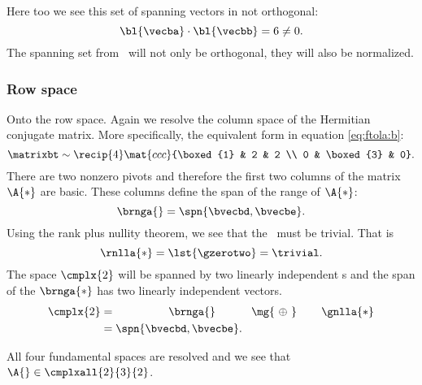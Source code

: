 Here too we see this set of spanning vectors in not orthogonal:
\begin{equation}
  {\bl{ \vecba }} \cdot {\bl{ \vecbb }} = 6 \ne 0.
\end{equation}
The spanning set from \asvd \ will not only be orthogonal, they will also be normalized.

\subsubsection{Row space}

Onto the row space. Again we resolve the column space of the Hermitian conjugate matrix. More specifically, the equivalent form in equation \eqref{eq:ftola:b}:
\begin{equation}
  \matrixbt \sim \recip{4}\mat{ccc}{\boxed{1} & 2 & 2 \\ 0 & \boxed{3} & 0}.
  \label{eq:ftola:b}
\end{equation}
There are two nonzero pivots and therefore the first two columns of the matrix $\A{*}$ are basic. These columns define the span of the range of $\A{*}$:
\begin{equation}
  \brnga{} = \spn{ \bvecbd, \bvecbe }.
  \label{eq:ftola:b domain}
\end{equation}
Using the rank plus nullity theorem, we see that the \ns \ must be trivial. That is
\begin{equation}
  \rnlla{*} = \lst{ \gzerotwo } = \trivial.
\end{equation}
The space $\cmplx{2}$ will be spanned by two linearly independent \vv s and the span of the $\brnga{*}$ has two linearly independent vectors. 
\begin{equation}
  \begin{split}
    \cmplx{2} 
      &= \qquad \qquad \ \ \brnga{} \qquad \quad \,  {\mg{\  \oplus \ }} \qquad \, \gnlla{*} \\
      &= \spn{ \bvecbd, \bvecbe } .
  \end{split}
  \label{eq:ftola:b:domain}
\end{equation}

%
All four fundamental spaces are resolved and we see that $\A{}\in\cmplxall{2}{3}{2}$.

\endinput